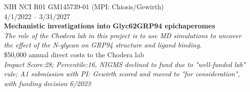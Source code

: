 \documentclass[10pt]{article}
\begin{document}
\vspace{1.5ex}

NIH NCI R01 GM145739‑01 (MPI: Chiosis/Gewirth)\\
4/1/2022 -- 3/31/2027\\
{\bf Mechanistic investigations into Glyc62GRP94 epichaperomes}\\
\emph{The role of the Chodera lab in this project is to use MD simulations to uncover the effect of the N-glycan on GRP94 structure and ligand binding.}\\
\$50,000 annual direct costs to the Chodera lab\\
\emph{Impact Score:28; Percentile:16, NIGMS declined to fund due to "well-funded lab" rule; A1 submission with PI: Gewirth scored and moved to "for consideration", with funding decision 6/2023}

%

%

\end{document}
